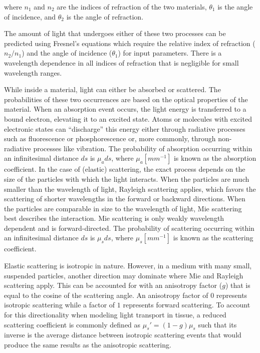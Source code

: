 \noindent where $n_1$ and $n_2$ are the indices of refraction of the two materials, $\theta_1$ is the angle of incidence, and $\theta_2$ is the angle of refraction.

The amount of light that undergoes either of these two processes can be predicted using Fresnel's equations which require the relative index of refraction ($n_2 / n_1$) and the angle of incidence ($\theta_1$) for input parameters.\cite{Pedrotti1993} There is a wavelength dependence in all indices of refraction that is negligible for small wavelength ranges.\cite{Knight2013}

While inside a material, light can either be absorbed or scattered. The probabilities of these two occurrences are based on the optical properties of the material. When an absorption event occurs, the light energy is transferred to a bound electron, elevating it to an excited state.\cite{Jacques2004} Atoms or molecules with excited electronic states can ``discharge'' this energy either through radiative processes such as fluorescence or phosphorescence or, more commonly, through non-radiative processes like vibration. The probability of absorption occurring within an infinitesimal distance $ds$ is $\mu_ads$, where $\mu_a [mm^{-1}]$ is known as the absorption coefficient. In the case of (elastic) scattering, the exact process depends on the size of the particles with which the light interacts. When the particles are much smaller than the wavelength of light, Rayleigh scattering applies, which favors the scattering of shorter wavelengths in the forward or backward directions.\cite{Prasad2003} When the particles are comparable in size to the wavelength of light, Mie scattering best describes the interaction. Mie scattering is only weakly wavelength dependent and is forward-directed.\cite{Jacques2004} The probability of scattering occurring within an infinitesimal distance $ds$ is $\mu_sds$, where $\mu_s [mm^{-1}]$ is known as the scattering coefficient. 

Elastic scattering is isotropic in nature. However, in a medium with many small, suspended particles, another direction may dominate where Mie and Rayleigh scattering apply. This can be accounted for with an anisotropy factor ($g$) that is equal to the cosine of the scattering angle. An anisotropy factor of $0$ represents isotropic scattering while a factor of $1$ represents forward scattering. To account for this directionality when modeling light transport in tissue, a reduced scattering coefficient is commonly defined as $\mu_s'=(1-g)\mu_s$ such that its inverse is the average distance between isotropic scattering events that would produce the same results as the anisotropic scattering.\cite{Gratton2004}

